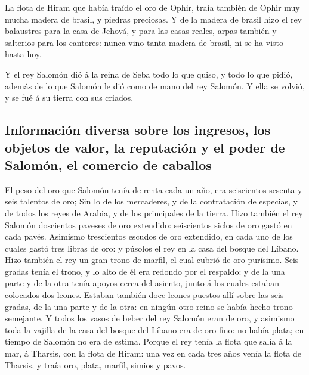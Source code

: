  La flota de Hiram que había traído el oro de Ophir, traía
también de Ophir muy mucha madera de brasil, y piedras preciosas.
 Y de la madera de brasil hizo el rey balaustres para la
casa de Jehová, y para las casas reales, arpas también y salterios para
los cantores: nunca vino tanta madera de brasil, ni se ha visto hasta
hoy.

 Y el rey Salomón dió á la reina de Seba todo lo que quiso,
y todo lo que pidió, además de lo que Salomón le dió como de mano del
rey Salomón. Y ella se volvió, y se fué á su tierra con sus criados.

\hypertarget{informaciuxf3n-diversa-sobre-los-ingresos-los-objetos-de-valor-la-reputaciuxf3n-y-el-poder-de-salomuxf3n-el-comercio-de-caballos}{%
\subsection{Información diversa sobre los ingresos, los objetos de
valor, la reputación y el poder de Salomón, el comercio de
caballos}\label{informaciuxf3n-diversa-sobre-los-ingresos-los-objetos-de-valor-la-reputaciuxf3n-y-el-poder-de-salomuxf3n-el-comercio-de-caballos}}

 El peso del oro que Salomón tenía de renta cada un año,
era seiscientos sesenta y seis talentos de oro;  Sin lo de
los mercaderes, y de la contratación de especias, y de todos los reyes
de Arabia, y de los principales de la tierra.  Hizo también
el rey Salomón doscientos paveses de oro extendido: seiscientos siclos
de oro gastó en cada pavés.  Asimismo trescientos escudos
de oro extendido, en cada uno de los cuales gastó tres libras de oro: y
púsolos el rey en la casa del bosque del Líbano.  Hizo
también el rey un gran trono de marfil, el cual cubrió de oro purísimo.
 Seis gradas tenía el trono, y lo alto de él era redondo
por el respaldo: y de la una parte y de la otra tenía apoyos cerca del
asiento, junto á los cuales estaban colocados dos leones. 
Estaban también doce leones puestos allí sobre las seis gradas, de la
una parte y de la otra: en ningún otro reino se había hecho trono
semejante.  Y todos los vasos de beber del rey Salomón eran
de oro, y asimismo toda la vajilla de la casa del bosque del Líbano era
de oro fino: no había plata; en tiempo de Salomón no era de estima.
 Porque el rey tenía la flota que salía á la mar, á
Tharsis, con la flota de Hiram: una vez en cada tres años venía la flota
de Tharsis, y traía oro, plata, marfil, simios y pavos.

